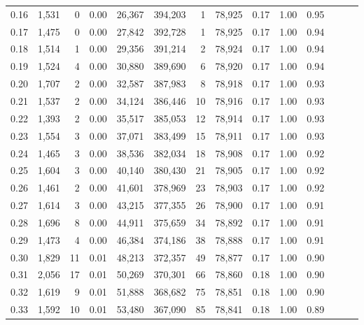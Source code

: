 \begin{tabular}{rrrrrrrrrrrrrr}
0.16 &   1,531 &      0 &  0.00 &   26,367 &  394,203 &       1 &  78,925 &  0.17 &  1.00 &      0.95 \\
0.17 &   1,475 &      0 &  0.00 &   27,842 &  392,728 &       1 &  78,925 &  0.17 &  1.00 &      0.94 \\
0.18 &   1,514 &      1 &  0.00 &   29,356 &  391,214 &       2 &  78,924 &  0.17 &  1.00 &      0.94 \\
0.19 &   1,524 &      4 &  0.00 &   30,880 &  389,690 &       6 &  78,920 &  0.17 &  1.00 &      0.94 \\
0.20 &   1,707 &      2 &  0.00 &   32,587 &  387,983 &       8 &  78,918 &  0.17 &  1.00 &      0.93 \\
0.21 &   1,537 &      2 &  0.00 &   34,124 &  386,446 &      10 &  78,916 &  0.17 &  1.00 &      0.93 \\
0.22 &   1,393 &      2 &  0.00 &   35,517 &  385,053 &      12 &  78,914 &  0.17 &  1.00 &      0.93 \\
0.23 &   1,554 &      3 &  0.00 &   37,071 &  383,499 &      15 &  78,911 &  0.17 &  1.00 &      0.93 \\
0.24 &   1,465 &      3 &  0.00 &   38,536 &  382,034 &      18 &  78,908 &  0.17 &  1.00 &      0.92 \\
0.25 &   1,604 &      3 &  0.00 &   40,140 &  380,430 &      21 &  78,905 &  0.17 &  1.00 &      0.92 \\
0.26 &   1,461 &      2 &  0.00 &   41,601 &  378,969 &      23 &  78,903 &  0.17 &  1.00 &      0.92 \\
0.27 &   1,614 &      3 &  0.00 &   43,215 &  377,355 &      26 &  78,900 &  0.17 &  1.00 &      0.91 \\
0.28 &   1,696 &      8 &  0.00 &   44,911 &  375,659 &      34 &  78,892 &  0.17 &  1.00 &      0.91 \\
0.29 &   1,473 &      4 &  0.00 &   46,384 &  374,186 &      38 &  78,888 &  0.17 &  1.00 &      0.91 \\
0.30 &   1,829 &     11 &  0.01 &   48,213 &  372,357 &      49 &  78,877 &  0.17 &  1.00 &      0.90 \\
0.31 &   2,056 &     17 &  0.01 &   50,269 &  370,301 &      66 &  78,860 &  0.18 &  1.00 &      0.90 \\
0.32 &   1,619 &      9 &  0.01 &   51,888 &  368,682 &      75 &  78,851 &  0.18 &  1.00 &      0.90 \\
0.33 &   1,592 &     10 &  0.01 &   53,480 &  367,090 &      85 &  78,841 &  0.18 &  1.00 &      0.89 \\

\end{tabular}
